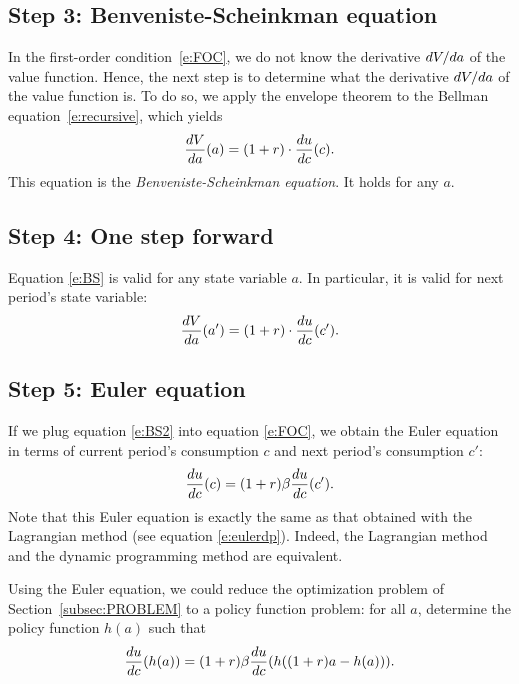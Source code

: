 \documentclass[letterpaper, 11pt, leqno]{article}
\begin{document}
\subsection{Step 3: Benveniste-Scheinkman equation}

In the first-order condition~\eqref{e:FOC}, we do not know the derivative $\odx{V}{a}$ of the value function. Hence, the next step is to determine what the derivative $\odx{V}{a}$ of the value function is. To do so, we apply the envelope theorem to the Bellman equation~\eqref{e:recursive}, which yields
\begin{equation}
 \od{V}{a}(a)=(1+r) \cdot \od{u}{c}(c).\label{e:BS}
\end{equation}
This equation is the \textit{Benveniste-Scheinkman equation}. It holds for any $a$.

\subsection{Step 4: One step forward}

Equation \eqref{e:BS} is valid for any state variable $a$. In particular, it is valid for next period's state variable:
\begin{equation}
\od{V}{a}(a')=(1+r)\cdot \od{u}{c}(c').\label{e:BS2}
\end{equation}

\subsection{Step 5: Euler equation}

If we plug equation \eqref{e:BS2} into equation \eqref{e:FOC}, we obtain the Euler equation in terms of current period's consumption $c$ and next period's consumption $c'$:
\begin{equation}
\od{u}{c}(c)=(1+r) \b \od{u}{c}(c').\label{Euler}
\end{equation}
Note that this Euler equation is exactly the same as that obtained with the Lagrangian method (see equation \eqref{e:eulerdp}). Indeed, the Lagrangian method and the dynamic programming method are equivalent.

Using the Euler equation, we could reduce the optimization problem of Section~\ref{subsec:PROBLEM} to a policy function problem: for all $a$, determine the policy function $h(a)$ such that
\begin{equation*}
\od{u}{c}(h(a))=(1+r) \b \od{u}{c}(h((1+r) a-h(a))).
\end{equation*}
\end{document}
